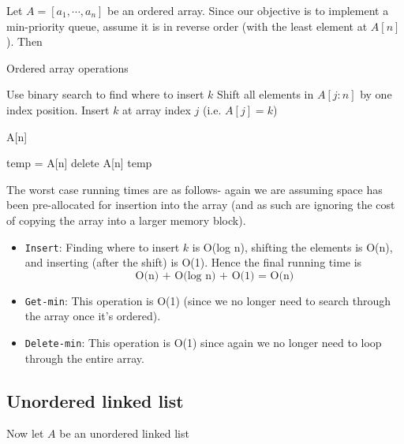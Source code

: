 \documentclass[paper=a4, fontsize=11pt]{scrartcl} %
\numberwithin{equation}{section} %
\numberwithin{figure}{section} %
\numberwithin{table}{section} %
\begin{document}
Let $A = [a_1, \cdots, a_n]$ be an ordered array. Since our objective is to implement a min-priority queue, assume it is in reverse order (with the least element at $A[n]$). Then

\begin{algorithm}\small
\caption{Ordered array operations}
\begin{algorithmic}
	\State Use binary search to find where to insert $k$
	\State Shift all elements in $A[j:n]$ by one index position.
	\State Insert $k$ at array index $j$ (i.e. $A[j] = k$)
\EndFunction
	
	\State \Return A[n]
\EndFunction

	\State temp = A[n]
	\State delete A[n]
	\State \Return temp
\EndFunction	
\end{algorithmic}
\end{algorithm}

The worst case running times are as follows- again we are assuming space has been pre-allocated for insertion into the array (and as such are ignoring the cost of copying the array into a larger memory block).

\begin{itemize}
\item \texttt{Insert}: Finding where to insert $k$ is O(log n), shifting the elements is O(n), and inserting (after the shift) is O(1). Hence the final running time is
\[\textrm{O(n) + O(log n) + O(1) = O(n)}\]
\item \texttt{Get-min}: This operation is O(1) (since we no longer need to search through the array once it's ordered).
\item \texttt{Delete-min}: This operation is O(1) since again we no longer need to loop through the entire array.
\end{itemize}

\subsection{Unordered linked list}

Now let $A$ be an unordered linked list
\end{document}
